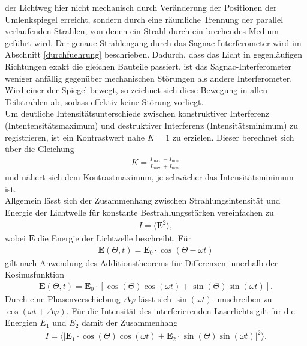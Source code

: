 der Lichtweg hier nicht mechanisch durch Veränderung der Positionen der
Umlenkspiegel erreicht, sondern durch eine räumliche Trennung der parallel
verlaufenden Strahlen, von denen ein Strahl durch ein brechendes Medium geführt
wird. Der genaue Strahlengang durch das Sagnac-Interferometer wird im Abschnitt
\ref{durchfuehrung} beschrieben. Dadurch, dass das Licht in gegenläufigen
Richtungen exakt die gleichen Bauteile passiert, ist das Sagnac-Interferometer
weniger anfällig gegenüber mechanischen Störungen als andere Interferometer. Wird
einer der Spiegel bewegt, so zeichnet sich diese Bewegung in allen Teilstrahlen
ab, sodass effektiv keine Störung vorliegt. \\
\noindent Um deutliche Intensitätsunterschiede zwischen konstruktiver Interferenz
(Intentensitätsmaximum) und destruktiver Interferenz (Intensitätsminimum) zu
registrieren, ist ein Kontrastwert nahe $K = 1$ zu erzielen. Dieser berechnet
sich über die Gleichung
\begin{align}
  K = \frac{I_\text{max.}- I_\text{min.}}{I_\text{max.} + I_\text{min.}}
  \label{eqn:01}
\end{align}
\noindent und nähert sich dem Kontrastmaximum, je schwächer das
Intensitätsminimum ist. \\
\noindent Allgemein lässt sich der Zusammenhang zwischen Strahlungsintensität
und Energie der Lichtwelle für konstante Bestrahlungsstärken vereinfachen zu
\begin{align}
  I = \langle \textbf{E}^2 \rangle,
  \label{eqn:02}
\end{align}
\noindent wobei $\textbf{E}$ die Energie der Lichtwelle beschreibt. Für
\begin{align}
  \textbf{E}(\Theta, t) = \textbf{E}_0 \cdot \cos(\Theta - \omega t)
  \label{eqn:03}
\end{align}
\noindent gilt nach Anwendung des Additionstheorems für Differenzen innerhalb der
Kosinusfunktion
\begin{align}
  \textbf{E}(\Theta, t) = \textbf{E}_0 \cdot \left[\cos(\Theta) \cos(\omega t) + \sin(\Theta) \sin(\omega t) \right].
  \label{eqn:04}
\end{align}
\noindent Durch eine Phasenverschiebung $\Delta \varphi$ lässt sich
$\sin(\omega t)$ umschreiben zu $\cos(\omega t + \Delta \varphi)$. Für die Intensität
des interferierenden Laserlichts gilt für die Energien $E_1$ und $E_2$ damit
der Zusammenhang
\begin{align}
  I = \langle | \textbf{E}_1 \cdot \cos(\Theta) \cos(\omega t) + \textbf{E}_2 \cdot \sin(\Theta) \sin(\omega t) |^2 \rangle.
  \label{eqn:05}
\end{align}
